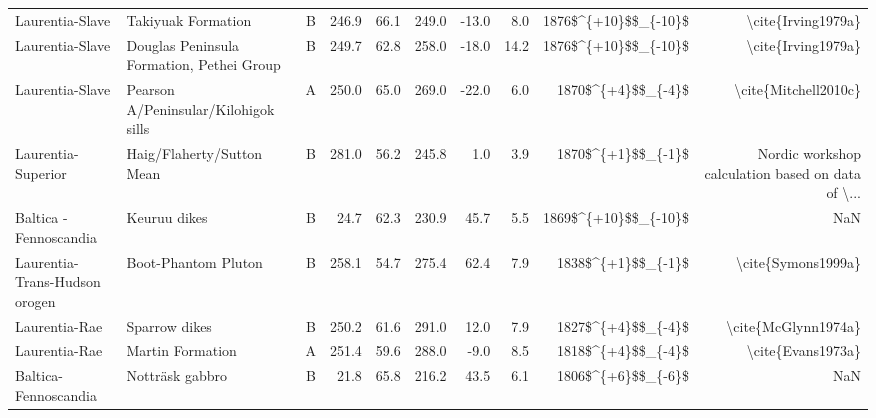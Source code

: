 \begin{longtable}{p{1 in}p{1 in}rrrrrrrr}
               Laurentia-Slave &                                 Takiyuak Formation &      B &     246.9 &      66.1 & 249.0 & -13.0 &       8.0 &   1876\$\textasciicircum \{+10\}\$\$\_\{-10\}\$ &                                 \textbackslash cite\{Irving1979a\} \\
               Laurentia-Slave &          Douglas Peninsula Formation, Pethei Group &      B &     249.7 &      62.8 & 258.0 & -18.0 &      14.2 &   1876\$\textasciicircum \{+10\}\$\$\_\{-10\}\$ &                                 \textbackslash cite\{Irving1979a\} \\
               Laurentia-Slave &               Pearson A/Peninsular/Kilohigok sills &      A &     250.0 &      65.0 & 269.0 & -22.0 &       6.0 &     1870\$\textasciicircum \{+4\}\$\$\_\{-4\}\$ &                               \textbackslash cite\{Mitchell2010c\} \\
            Laurentia-Superior &                         Haig/Flaherty/Sutton Mean  &      B &     281.0 &      56.2 & 245.8 &   1.0 &       3.9 &     1870\$\textasciicircum \{+1\}\$\$\_\{-1\}\$ &  Nordic workshop calculation based on data of \textbackslash ... \\
        Baltica - Fennoscandia &                                      Keuruu dikes  &     B  &      24.7 &      62.3 & 230.9 &  45.7 &       5.5 &   1869\$\textasciicircum \{+10\}\$\$\_\{-10\}\$ &                                                NaN \\
 Laurentia-Trans-Hudson orogen &                                Boot-Phantom Pluton &      B &     258.1 &      54.7 & 275.4 &  62.4 &       7.9 &     1838\$\textasciicircum \{+1\}\$\$\_\{-1\}\$ &                                 \textbackslash cite\{Symons1999a\} \\
                 Laurentia-Rae &                                      Sparrow dikes &      B &     250.2 &      61.6 & 291.0 &  12.0 &       7.9 &     1827\$\textasciicircum \{+4\}\$\$\_\{-4\}\$ &                                \textbackslash cite\{McGlynn1974a\} \\
                 Laurentia-Rae &                                   Martin Formation &      A &     251.4 &      59.6 & 288.0 &  -9.0 &       8.5 &     1818\$\textasciicircum \{+4\}\$\$\_\{-4\}\$ &                                  \textbackslash cite\{Evans1973a\} \\
          Baltica-Fennoscandia &                                    Notträsk gabbro &      B &      21.8 &      65.8 & 216.2 &  43.5 &       6.1 &     1806\$\textasciicircum \{+6\}\$\$\_\{-6\}\$ &                                                NaN \\

\end{longtable}
